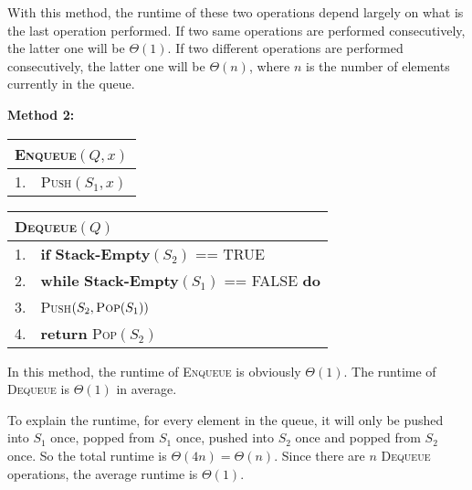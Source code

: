 \documentclass[a4paper,12pt]{article}
\begin{document}
With this method, the runtime of these two operations depend largely on what is the last operation performed.
If two same operations are performed consecutively, the latter one will be $\Theta(1)$.
If two different operations are performed consecutively, the latter one will be $\Theta(n)$, where $n$ is the number of elements currently in the queue.

\textbf{Method 2:}
\begin{center}
	\begin{tabular}{ll}
		\toprule
		\multicolumn{2}{l}{\textsc{Enqueue}$(Q,x)$} \\
		\midrule
		1. & \textsc{Push}$(S_1,x)$ \\
		\bottomrule
	\end{tabular}
\end{center}

\begin{center}
	\begin{tabular}{ll}
		\toprule
		\multicolumn{2}{l}{\textsc{Dequeue}$(Q)$} \\
		\midrule
		1. & \textbf{if} \textbf{Stack-Empty}$(S_2)$ == TRUE \\
		2. & \quad \textbf{while} \textbf{Stack-Empty}$(S_1)$ == FALSE \textbf{do} \\
		3. & \quad \quad \textsc{Push}$(S_2,\textsc{Pop}(S_1))$ \\
		4. & \textbf{return} \textsc{Pop}$(S_2)$ \\
		\bottomrule
	\end{tabular}
\end{center}

In this method, the runtime of \textsc{Enqueue} is obviously $\Theta(1)$.
The runtime of \textsc{Dequeue} is $\Theta(1)$ in average.

To explain the runtime, for every element in the queue, it will only be pushed into $S_1$ once, popped from $S_1$ once, pushed into $S_2$ once and popped from $S_2$ once.
So the total runtime is $\Theta(4n) = \Theta(n)$.
Since there are $n$ \textsc{Dequeue} operations, the average runtime is $\Theta(1)$.
\end{document}
